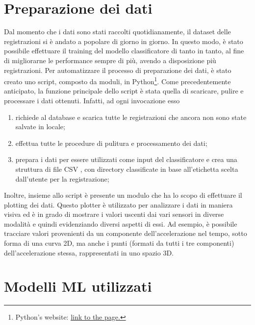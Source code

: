\section{Preparazione dei dati} 

Dal momento che i dati sono stati raccolti quotidianamente, il dataset delle registrazioni
si è andato a popolare di giorno in giorno. In questo modo, è stato possibile effettuare il 
training del modello classificatore di tanto in tanto, al fine di migliorarne le performance
\cite{impact_training_dataset_size}
sempre di più, avendo a disposizione più registrazioni. Per automatizzare il processo di 
preparazione dei dati, è stato creato uno script, composto da moduli, in Python\footnote{
Python's website: 
\href{https://www.python.org}{\underline{link to the page.}}}. Come
precedentemente anticipato, la funzione principale dello script è stata quella di scaricare,
pulire e processare i dati ottenuti. Infatti, ad ogni invocazione esso
\begin{enumerate}
    \item richiede al database e scarica tutte le registrazioni che ancora non sono state 
    salvate in locale;
    \item effettua tutte le procedure di pulitura e processamento dei dati;
    \item prepara i dati per essere utilizzati come input del classificatore e crea una 
    struttura di file CSV \cite{common_format_csv}, con directory classificate in 
    base all'etichetta scelta dall'utente per la registrazione;
\end{enumerate}
Inoltre, insieme allo script è presente un modulo che ha lo scopo di effettuare il plotting
dei dati. Questo plotter è utilizzato per analizzare i dati in maniera visiva ed è in
grado di mostrare i valori uscenti dai vari sensori in diverse modalità e quindi
evidenziando diversi aspetti di essi. Ad esempio, è possibile tracciare valori provenienti
da un componente dell'accelerazione nel tempo, sotto forma di una curva 2D, ma anche i 
punti (formati da tutti i tre componenti) dell'accelerazione stessa, rappresentati in uno 
spazio 3D.

\section{Modelli ML utilizzati} 

